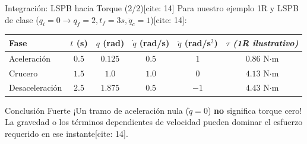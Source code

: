 \documentclass[aspectratio=169, xcolor={table,xcdraw}]{beamer}
\begin{document}
\begin{frame}{Integración: LSPB hacia Torque (2/2)[cite: 14]}
    Para nuestro ejemplo 1R y LSPB de clase ($q_i=0 \to q_f=2, t_f=3s, \ddot{q}_c=1$)[cite: 14]:
    
    \begin{center}
        \footnotesize
        \renewcommand{\arraystretch}{1.2}
        \begin{tabular}{l c c c c | c}
        \toprule
        \textbf{Fase} & $t$ (s) & $q$ (rad) & $\dot{q}$ (rad/s) & $\ddot{q}$ (rad/s$^2$) & $\tau$ \textit{(1R ilustrativo)} \\ \midrule
        Aceleración & $0.5$ & $0.125$ & $0.5$ & $1$ & $0.86$ N$\cdot$m \\
        Crucero & $1.5$ & $1.0$ & $1.0$ & $0$ & $4.13$ N$\cdot$m \\
        Desaceleración & $2.5$ & $1.875$ & $0.5$ & $-1$ & $4.43$ N$\cdot$m \\ \bottomrule
        \end{tabular}
    \end{center}
    
    \vfill
    \begin{alertblock}{Conclusión Fuerte}
        \small ¡Un tramo de aceleración nula ($\ddot{q}=0$) \textbf{no} significa torque cero! La gravedad o los términos dependientes de velocidad pueden dominar el esfuerzo requerido en ese instante[cite: 14].
    \end{alertblock}
\end{frame}
\end{document}
